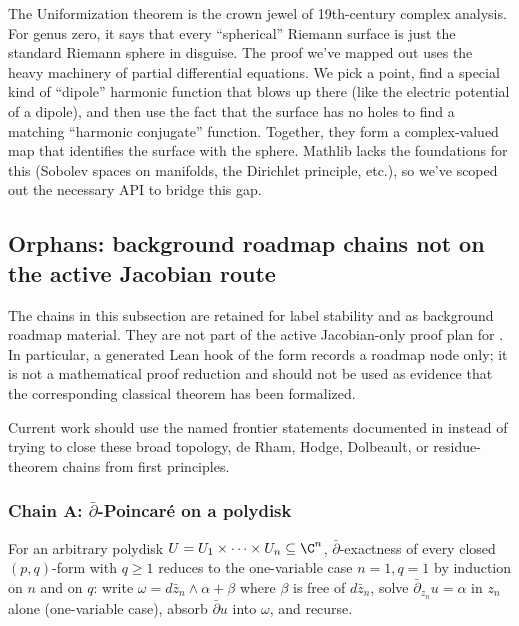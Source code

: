 \begin{layman}
The Uniformization theorem is the crown jewel of 19th-century complex analysis. For genus zero, it says that every ``spherical'' Riemann surface is just the standard Riemann sphere in disguise. The proof we've mapped out uses the heavy machinery of partial differential equations. We pick a point, find a special kind of ``dipole'' harmonic function that blows up there (like the electric potential of a dipole), and then use the fact that the surface has no holes to find a matching ``harmonic conjugate'' function. Together, they form a complex-valued map that identifies the surface with the sphere. Mathlib lacks the foundations for this (Sobolev spaces on manifolds, the Dirichlet principle, etc.), so we've scoped out the necessary API to bridge this gap.
\end{layman}


\subsection{Orphans: background roadmap chains not on the active Jacobian route}
\label{subsec:classical-analysis-orphans}

The chains in this subsection are retained for label stability and as
background roadmap material.  They are not part of the active
Jacobian-only proof plan for .  In
particular, a generated Lean hook of the form
 records a roadmap node only; it is not a
mathematical proof reduction and should not be used as evidence that the
corresponding classical theorem has been formalized.

Current work should use the named frontier statements documented in
 instead of trying to close these
broad topology, de Rham, Hodge, Dolbeault, or residue-theorem chains
from first principles.
\subsubsection*{Chain A: $\bar\partial$-Poincar\'e on a polydisk}

\begin{lemma}[Pass A.1: reduce to one-variable, $q=1$]
\label{lem:dpp-r1-onevar-suffices}
For an arbitrary polydisk $U = U_{1} \times \cdots \times U_{n}
\subseteq \C^{n}$, $\bar\partial$-exactness of every closed
$(p,q)$-form with $q \geq 1$ reduces to the one-variable case
$n=1, q=1$ by induction on $n$ and on $q$: write
$\omega = d\bar z_{n} \wedge \alpha + \beta$ where $\beta$ is free
of $d\bar z_{n}$, solve $\bar\partial_{z_{n}} u = \alpha$ in
$z_{n}$ alone (one-variable case), absorb $\bar\partial u$ into
$\omega$, and recurse.
\leanok
\end{lemma}

